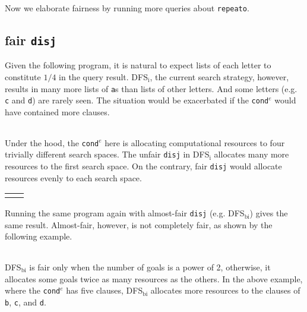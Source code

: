 \documentclass[format=acmlarge, review=true, authordraft=true]{acmart}
\newcommand{\conde}{\texttt{cond$^e$}}
\newcommand{\disj}{\texttt{disj}}
\newcommand{\DFSi }[0]{DFS$_\textrm{i}$}
\newcommand{\DFSbi}[0]{DFS$_\textrm{bi}$}
\begin{document}

Now we elaborate fairness by running more queries about \texttt{repeato}.

\subsection{fair \texttt{disj}}

Given the following program, it is natural to expect lists of each letter to
constitute $1/4$ in the query result. \DFSi, the current search
strategy, however, results in many more lists of \texttt{a}s than lists
of other letters. And some letters  (e.g. \texttt{c} and \texttt{d}) are
rarely seen. The situation would be exacerbated if the \conde{} would have
contained more clauses.

\begin{center}
	\begin{tabular}{c}
		
	\end{tabular}
\end{center}

Under the hood, the \conde{} here is allocating computational resources to 
four trivially different search spaces. The unfair \disj{} in 
\DFSi{} allocates many more resources to the first search space. On the 
contrary, fair \disj{} would allocate resources evenly to each search space. 

\begin{center}
	\begin{tabular}{l|r}
		 &
		
	\end{tabular}
\end{center}

Running the same program again with almost-fair \disj {} (e.g. 
\DFSbi{}) gives the same result. Almost-fair, however, is not 
completely fair, as shown by the following example. 

\begin{center}
	\begin{tabular}{c}
		
	\end{tabular}
\end{center}

\DFSbi{} is fair only when the number of goals is a power of 2, 
otherwise, it allocates some goals twice as many resources as the 
others. In the above example, where the \conde{} has five clauses, \DFSbi{} 
allocates more resources to the clauses of \texttt{b}, \texttt{c}, and 
\texttt{d}.
\end{document}
